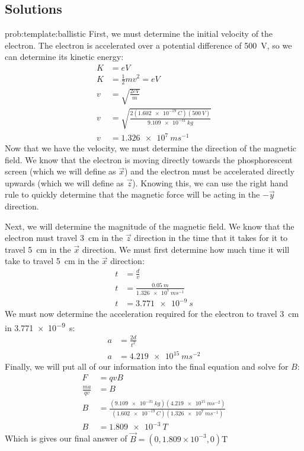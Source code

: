 \newpage
\subsection{Solutions}
\begin{solution}{prob:template:ballistic}\label{soln:template:ballistic}
First, we must determine the initial velocity of the electron. The electron is accelerated over a potential difference of \SI{500}{V}, so we can determine its kinetic energy:
\begin{align*}
K &= eV\\
K &= \frac{1}{2} mv^2 = eV\\
v &= \sqrt{\frac{2eV}{m}}\\
v &= \sqrt{\frac{2(\SI{1.602e-19}{C})(\SI{500}{V})}{\SI{9.109e-31}{kg}}}\\
v &= \SI{1.326e7}{ms^{-1}}
\end{align*}
Now that we have the velocity, we must determine the direction of the magnetic field. We know that the electron is moving directly towards the phosphorescent screen (which we will define as $\vec x$) and the electron must be accelerated directly upwards (which we will define as $\vec z$). Knowing this, we can use the right hand rule to quickly determine that the magnetic force will be acting in the $-\vec y$ direction. 

Next, we will determine the magnitude of the magnetic field. We know that the electron must travel \SI{3}{cm} in the $\vec z$ direction in the time that it takes for it to travel \SI{5}{cm} in the $\vec x$ direction. We must first determine how much time it will take to travel \SI{5}{cm} in the $\vec x$ direction:
\begin{align*}
t &= \frac{d}{v}\\
t &= \frac{\SI{0.05}{m}}{\SI{1.326e7}{ms^{-1}}}\\
t &= \SI{3.771e-9}{s}
\end{align*}
We must now determine the acceleration required for the electron to travel \SI{3}{cm} in \SI{3.771e-9}{s}:
\begin{align*}
a &= \frac{2d}{t^2}\\
a &= \SI{4.219e15}{ms^{-2}}
\end{align*}
Finally, we will put all of our information into the final equation and solve for $B$:
\begin{align*}
F&=qvB\\
\frac{ma}{qv} &= B\\
 B&= \frac{(\SI{9.109e-31}{kg})(\SI{4.219e15}{ms^{-2}})}{(\SI{1.602e-19}{C})(\SI{1.326e7}{ms^{-1}})}\\
 B&= \SI{1.809e-3}{T}
\end{align*}
Which is gives our final answer of $\vec B = (0,1.809\times 10^{-3},0)\text{T}$
\end{solution}



